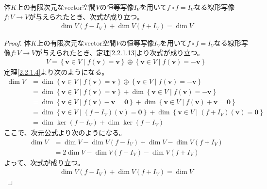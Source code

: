 \documentclass[dvipdfmx]{jsarticle}
\begin{document}
\begin{thm}\label{2.2.1.14}
体$K$上の有限次元なvector空間$V$の恒等写像$I_{V}$を用いて$f \circ f = I_{V}$なる線形写像$f:V \rightarrow V$が与えられたとき、次式が成り立つ。
\begin{align*}
\dim{V\left( f - I_{V} \right)} + \dim{V\left( f + I_{V} \right)} = \dim V
\end{align*}
\end{thm}
\begin{proof}
体$K$上の有限次元なvector空間$V$の恒等写像$I_{V}$を用いて$f \circ f = I_{V}$なる線形写像$f:V \rightarrow V$が与えられたとき、定理\ref{2.2.1.13}より次式が成り立つ。
\begin{align*}
V = \left\{ \mathbf{v} \in V \middle| f\left( \mathbf{v} \right) = \mathbf{v} \right\} \oplus \left\{ \mathbf{v} \in V \middle| f\left( \mathbf{v} \right) = - \mathbf{v} \right\}
\end{align*}
定理\ref{2.2.1.4}より次のようになる。
\begin{align*}
\dim V &= \dim{\left\{ \mathbf{v} \in V \middle| f\left( \mathbf{v} \right) = \mathbf{v} \right\} \oplus \left\{ \mathbf{v} \in V \middle| f\left( \mathbf{v} \right) = - \mathbf{v} \right\}}\\
&= \dim\left\{ \mathbf{v} \in V \middle| f\left( \mathbf{v} \right) = \mathbf{v} \right\} + \dim\left\{ \mathbf{v} \in V \middle| f\left( \mathbf{v} \right) = - \mathbf{v} \right\}\\
&= \dim\left\{ \mathbf{v} \in V \middle| f\left( \mathbf{v} \right) - \mathbf{v} = \mathbf{0} \right\} + \dim\left\{ \mathbf{v} \in V \middle| f\left( \mathbf{v} \right) + \mathbf{v} = \mathbf{0} \right\}\\
&= \dim\left\{ \mathbf{v} \in V \middle| \left( f - I_{V} \right)\left( \mathbf{v} \right) = \mathbf{0} \right\} + \dim\left\{ \mathbf{v} \in V \middle| \left( f + I_{V} \right)\left( \mathbf{v} \right) = \mathbf{0} \right\}\\
&= \dim{\ker\left( f - I_{V} \right)} + \dim{\ker\left( f - I_{V} \right)}
\end{align*}
ここで、次元公式より次のようになる。
\begin{align*}
\dim V &= \dim V - \dim{V\left( f - I_{V} \right)} + \dim V - \dim{V\left( f + I_{V} \right)}\\
&= 2\dim V - \dim{V\left( f - I_{V} \right)} - \dim{V\left( f + I_{V} \right)}
\end{align*}
よって、次式が成り立つ。
\begin{align*}
\dim{V\left( f - I_{V} \right)} + \dim{V\left( f + I_{V} \right)} = \dim V
\end{align*}
\end{proof}
\end{document}
